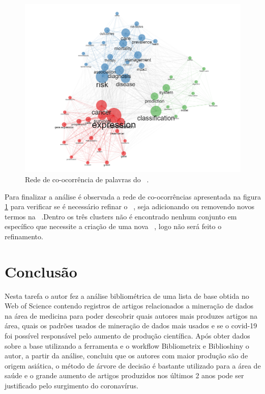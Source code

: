 \begin{figure}
    \centering
    \includegraphics[width=1\textwidth]{experiments/vinis-caixe/PesqBibliogr/MineracaoDados/WoS-20220204/Dataset/Coocurrence-2022-02-10.PNG}
    \caption{Rede de co-ocorrência de palavras do \dataset\ .}
    \label{fig:cit:coocurrence:vinis-caixe}
\end{figure}

Para finalizar a análise é observada a rede de co-ocorrências apresentada na figura \ref{fig:cit:coocurrence:vinis-caixe} para verificar se é necessário refinar o \dataset\ , seja adicionando ou removendo novos termos na \query\ .Dentro os três clusters não é encontrado nenhum conjunto em específico que necessite a criação de uma nova \query\ , logo não será feito o refinamento.

\section{Conclusão}

Nesta tarefa o autor fez a análise bibliométrica de uma lista de base obtida no Web of Science contendo registros de artigos relacionados a mineração de dados na área de medicina para poder descobrir quais autores mais produzes artigos na área, quais os padrões usados de mineração de dados mais usados e se o covid-19 foi possível responsável pelo aumento de produção científica. Após obter dados sobre a base utilizando a ferramenta e o workflow Bibliometrix e Biblioshiny o autor, a partir da análise, concluiu que os autores com maior produção são de origem asiática, o método de árvore de decisão é bastante utilizado para a área de saúde e o grande aumento de artigos produzidos nos últimos 2 anos pode ser justificado pelo surgimento do coronavírus.